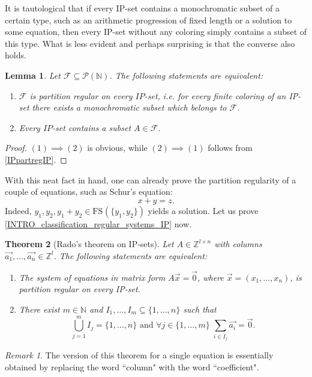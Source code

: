 \documentclass{article}
\theoremstyle{definition}
\theoremstyle{plain}
\newtheorem{theorem}{Theorem}[section]
\newtheorem{lemma}[theorem]{Lemma}
\theoremstyle{remark}
\newtheorem{remark}{Remark}[section]
\newcommand{\N}{\ensuremath{\mathbb{N}}}
\newcommand{\Z}{\ensuremath{\mathbb{Z}}}
\newcommand{\FF}{\ensuremath{\mathcal{F}}}
\newcommand{\PP}{\ensuremath{\mathcal{P}}}
\newcommand{\FS}[2][]{\ensuremath{\mathrm{FS}^{#1}\left(#2\right)}}
\begin{document}
It is tautological that if every IP-set contains a monochromatic subset of a certain type, such as an arithmetic progression of fixed length or a solution to some equation, then every IP-set without any coloring simply contains a subset of this type. What is less evident and perhaps surprising is that the converse also holds.
\begin{lemma}\label{neat_fact}
    Let $\FF \subseteq \PP(\N)$. The following statements are equivalent:

    \begin{enumerate}
        \item $\FF$ is partition regular on every $IP$-set, i.e. for every finite coloring of an IP-set there exists a monochromatic subset which belongs to $\FF$.
        \item Every $IP$-set contains a subset $A \in \FF$.
    \end{enumerate}
\end{lemma}
\begin{proof}
    $(1) \implies (2)$ is obvious, while $(2) \implies (1)$ follows from \cref{IPpartregIP}.
\end{proof}

With this neat fact in hand, one can already prove the partition regularity of a couple of equations, such as Schur's equation:
$$x+y = z.$$
Indeed, $y_1,y_2, y_1+y_2 \in \FS{\{y_1,y_2\}}$ yields a solution. Let us prove \cref{INTRO_classification_regular_systems_IP} now.

\begin{theorem}[Rado's theorem on IP-sets]\label{classification_regular_systems_IP}
    Let $A \in \Z^{l\times n}$ with columns $\Vec{a_1}, \ldots, \Vec{a_n} \in \Z^l$. The following statements are equivalent:
    \begin{enumerate}
        \item The system of equations in matrix form $A\Vec{x} = \Vec{0}$, where $\Vec{x}= (x_1,\ldots,x_n)$, is partition regular on every IP-set.
        \item There exist $m\in \N$ and $I_1, \ldots, I_m \subseteq \{1,\ldots,n\}$ such that 
        $$\bigcup_{j=1}^m I_j = \{1,\ldots,n\} \text{ and } \forall j \in \{1,\ldots,m\} \; \sum_{i \in I_j} \Vec{a_i} = \Vec{0}.$$
    \end{enumerate}
\end{theorem}
\begin{remark}
    The version of this theorem for a single equation is essentially obtained by replacing the word “column" with the word “coefficient".
\end{remark}
        
\end{document}
